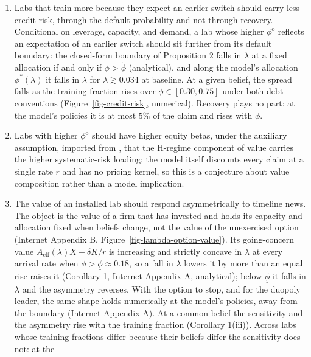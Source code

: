 \documentclass[
  11pt,
  letterpaper,
]{scrartcl}
\providecommand{\tightlist}{%
  \setlength{\itemsep}{0pt}\setlength{\parskip}{0pt}}
\begin{document}
\begin{enumerate}
\def\labelenumi{\arabic{enumi}.}
\tightlist
\item
  Labs that train more because they expect an earlier switch should
  carry less credit risk, through the default probability and not
  through recovery. Conditional on leverage, capacity, and demand, a lab
  whose higher \(\phi^{\mathrm{o}}\) reflects an expectation of an
  earlier switch should sit further from its default boundary: the
  closed-form boundary of Proposition 2 falls in \(\lambda\) at a fixed
  allocation if and only if \(\phi > \tilde{\phi}\) (analytical), and
  along the model's allocation \(\phi^*(\lambda)\) it falls in
  \(\lambda\) for \(\lambda \gtrsim 0.034\) at baseline. At a given
  belief, the spread falls as the training fraction rises over
  \(\phi \in [0.30, 0.75]\) under both debt conventions
  (Figure~\ref{fig-credit-risk}, numerical). Recovery plays no part: at
  the model's policies it is at most \(5\%\) of the claim and rises with
  \(\phi\).
\item
  Labs with higher \(\phi^{\mathrm{o}}\) should have higher equity
  betas, under the auxiliary assumption, imported from
  \citet{aguerrevere2009real}, that the H-regime component of value
  carries the higher systematic-risk loading; the model itself discounts
  every claim at a single rate \(r\) and has no pricing kernel, so this
  is a conjecture about value composition rather than a model
  implication.
\item
  The value of an installed lab should respond asymmetrically to
  timeline news. The object is the value of a firm that has invested and
  holds its capacity and allocation fixed when beliefs change, not the
  value of the unexercised option (Internet Appendix B,
  Figure~\ref{fig-lambda-option-value}). Its going-concern value
  \(A_{\text{eff}}(\lambda) X - \delta K/r\) is increasing and strictly
  concave in \(\lambda\) at every arrival rate when
  \(\phi > \underline{\phi} \approx 0.18\), so a fall in \(\lambda\)
  lowers it by more than an equal rise raises it (Corollary 1, Internet
  Appendix A, analytical); below \(\underline{\phi}\) it falls in
  \(\lambda\) and the asymmetry reverses. With the option to stop, and
  for the duopoly leader, the same shape holds numerically at the
  model's policies, away from the boundary (Internet Appendix A). At a
  common belief the sensitivity and the asymmetry rise with the training
  fraction (Corollary 1(iii)). Across labs whose training fractions
  differ because their beliefs differ the sensitivity does not: at the

\end{enumerate}
\end{document}
